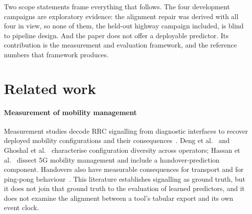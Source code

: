 \documentclass[preprint,review,12pt]{elsarticle}\usepackage{lineno}\linenumbers
\begin{document}
Two scope statements frame everything that follows. The four development campaigns are exploratory evidence: the alignment repair was derived with all four in view, so none of them, the held-out highway campaign included, is blind to pipeline design. And the paper does not offer a deployable predictor. Its contribution is the measurement and evaluation framework, and the reference numbers that framework produces.

\section{Related work}
\label{sec:related}

\paragraph{Measurement of mobility management} Measurement studies decode RRC signalling from diagnostic interfaces to recover deployed mobility configurations and their consequences~\cite{ref3,ref4,ref5,ref41}. Deng et al.~\cite{ref3} and Ghoshal et al.~\cite{ref4} characterise configuration diversity across operators; Hassan et al.~\cite{ref5} dissect 5G mobility management and include a handover-prediction component. Handovers also have measurable consequences for transport and for ping-pong behaviour~\cite{ref6,ref14}. This literature establishes signalling as ground truth, but it does not join that ground truth to the evaluation of learned predictors, and it does not examine the alignment between a tool's tabular export and its own event clock.
\end{document}
